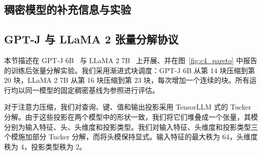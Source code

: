 \begin{appendixpart}




\section{稠密模型的补充信息与实验}
\subsection{GPT-J 与 LLaMA 2 张量分解协议}
\label{app:gptj_llama_tensor_protocol}

本节描述在 GPT-J 6B~\citep{gpt-j} 与 LLaMA 2 7B~\citep{touvron2023llama} 上开展、并在图~\ref{fig:c4_pareto} 中报告的训练后张量分解实验。我们采用渐进式块调度：GPT-J 6B 从第 14 块压缩到第 20 块，LLaMA 2 7B 从第 16 块压缩到第 23 块，每次增加一个连续的块。所有运行均以同一模型的固定稠密基线为参照进行评估。

对于注意力压缩，我们对查询、键、值和输出投影采用 TensorLLM 式的 Tucker 分解。由于这些投影在两个模型中的形状一致，我们将它们堆叠成一个张量，其模分别为输入特征、头、头维度和投影类型。我们对输入特征、头维度和投影类型三个模施加部分 Tucker 分解，而将头模保持显式。输入特征的最大秩为 64，头维度秩为 4，投影类型秩为 2。


\end{appendixpart}
